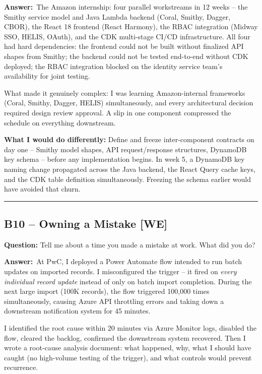 \documentclass[letterpaper,10pt]{article}
\newlength{\boxwidth}
\newcommand{\bquestionbox}[1]{%
  \vspace{6pt}%
  \noindent\colorbox{bqbg}{%
    \begin{minipage}{\boxwidth}%
      \vspace{3pt}\textbf{\textcolor{orange!70!black}{Question:}} #1\vspace{3pt}%
    \end{minipage}%
  }\vspace{2pt}%
}
\newcommand{\answerlabel}{\noindent\textbf{\textcolor{answerblue}{Answer:}}~}
\begin{document}
\answerlabel The Amazon internship: four parallel workstreams in 12 weeks -- the Smithy service model and Java Lambda backend (Coral, Smithy, Dagger, CBOR), the React 18 frontend (React Harmony), the RBAC integration (Midway SSO, HELIS, OAuth), and the CDK multi-stage CI/CD infrastructure. All four had hard dependencies: the frontend could not be built without finalized API shapes from Smithy; the backend could not be tested end-to-end without CDK deployed; the RBAC integration blocked on the identity service team's availability for joint testing.

What made it genuinely complex: I was learning Amazon-internal frameworks (Coral, Smithy, Dagger, HELIS) simultaneously, and every architectural decision required design review approval. A slip in one component compressed the schedule on everything downstream.

\textbf{What I would do differently:} Define and freeze inter-component contracts on day one -- Smithy model shapes, API request/response structures, DynamoDB key schema -- before any implementation begins. In week 5, a DynamoDB key naming change propagated across the Java backend, the React Query cache keys, and the CDK table definition simultaneously. Freezing the schema earlier would have avoided that churn.

\rule{\linewidth}{0.2pt}

\subsection*{B10 -- Owning a Mistake \textmd{[WE]}}

\bquestionbox{Tell me about a time you made a mistake at work. What did you do?}

\answerlabel At PwC, I deployed a Power Automate flow intended to run batch updates on imported records. I misconfigured the trigger -- it fired on \textit{every individual record update} instead of only on batch import completion. During the next large import (100K records), the flow triggered 100,000 times simultaneously, causing Azure API throttling errors and taking down a downstream notification system for 45 minutes.

I identified the root cause within 20 minutes via Azure Monitor logs, disabled the flow, cleared the backlog, confirmed the downstream system recovered. Then I wrote a root-cause analysis document: what happened, why, what I should have caught (no high-volume testing of the trigger), and what controls would prevent recurrence.
\end{document}
